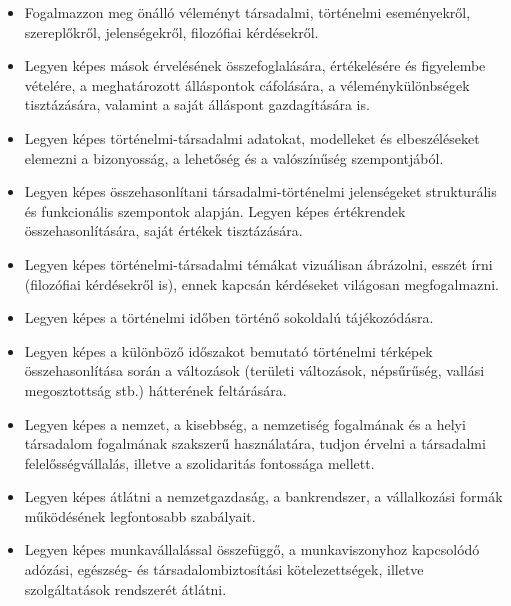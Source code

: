 \begin{itemize}
\item Fogalmazzon meg önálló véleményt társadalmi, történelmi eseményekről, szereplőkről, jelenségekről, filozófiai kérdésekről.
\item Legyen képes mások érvelésének összefoglalására, értékelésére és figyelembe vételére, a meghatározott álláspontok cáfolására, a véleménykülönbségek tisztázására, valamint a saját álláspont gazdagítására is.
\item Legyen képes történelmi-társadalmi adatokat, modelleket és elbeszéléseket elemezni a bizonyosság, a lehetőség és a valószínűség szempontjából.
\item Legyen képes összehasonlítani társadalmi-történelmi jelenségeket strukturális és funkcionális szempontok alapján. Legyen képes értékrendek összehasonlítására, saját értékek tisztázására.
\item Legyen képes történelmi-társadalmi témákat vizuálisan ábrázolni, esszét írni (filozófiai kérdésekről is), ennek kapcsán kérdéseket világosan megfogalmazni.
\item Legyen képes a történelmi időben történő sokoldalú tájékozódásra.
\item Legyen képes a különböző időszakot bemutató történelmi térképek összehasonlítása során a változások (területi változások, népsűrűség, vallási megosztottság stb.) hátterének feltárására.
\item Legyen képes a nemzet, a kisebbség, a nemzetiség fogalmának és a helyi társadalom fogalmának szakszerű használatára, tudjon érvelni a társadalmi felelősségvállalás, illetve a szolidaritás fontossága mellett.
\item Legyen képes átlátni a nemzetgazdaság, a bankrendszer, a vállalkozási formák működésének legfontosabb szabályait.
\item Legyen képes munkavállalással összefüggő, a munkaviszonyhoz kapcsolódó adózási, egészség- és társadalombiztosítási kötelezettségek, illetve szolgáltatások rendszerét átlátni.
\end{itemize}
